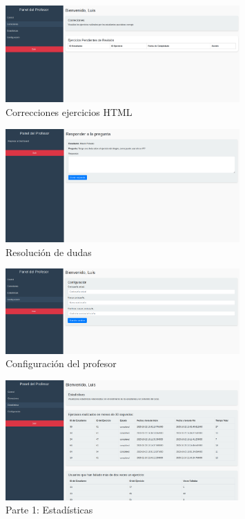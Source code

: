 \begin{appendices}
\begin{figure}[H]
    \centering
    \includegraphics[width=0.8\textwidth]{imagenes/Manual/correciones.png}
    \caption{Correcciones ejercicios HTML}
\end{figure}

\begin{figure}[H]
    \centering
    \includegraphics[width=0.8\textwidth]{imagenes/Manual/panelcontestar.png}
    \caption{Resolución de dudas}
\end{figure}

\begin{figure}[H]
    \centering
    \includegraphics[width=0.8\textwidth]{imagenes/Manual/configuracionprofesor.png}
    \caption{Configuración del profesor}
\end{figure}

\begin{figure}[H]
    \centering
    \includegraphics[width=0.8\textwidth]{imagenes/Manual/estadistica4.png}
    \caption{Parte 1: Estadísticas}
\end{figure}


\end{appendices}
